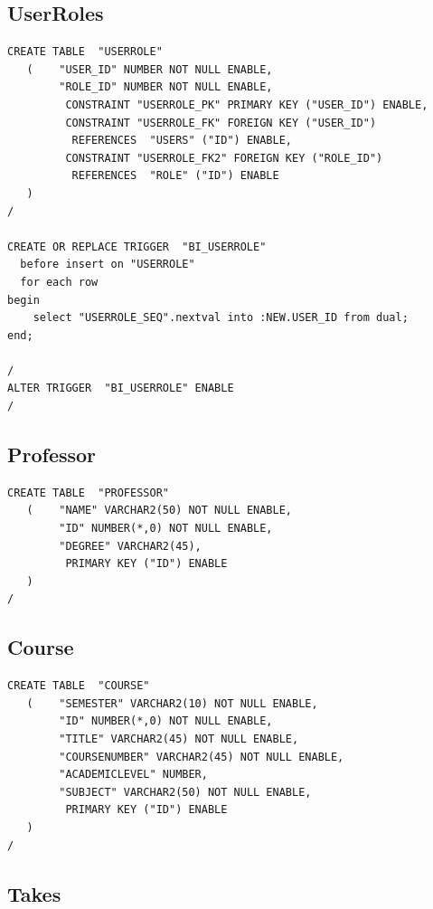 \documentclass[11pt]{article}
\begin{document}
\subsection{UserRoles}
\label{sec-4-3}



\begin{verbatim}
CREATE TABLE  "USERROLE" 
   (    "USER_ID" NUMBER NOT NULL ENABLE, 
        "ROLE_ID" NUMBER NOT NULL ENABLE, 
         CONSTRAINT "USERROLE_PK" PRIMARY KEY ("USER_ID") ENABLE, 
         CONSTRAINT "USERROLE_FK" FOREIGN KEY ("USER_ID")
          REFERENCES  "USERS" ("ID") ENABLE, 
         CONSTRAINT "USERROLE_FK2" FOREIGN KEY ("ROLE_ID")
          REFERENCES  "ROLE" ("ID") ENABLE
   )
/

CREATE OR REPLACE TRIGGER  "BI_USERROLE" 
  before insert on "USERROLE"               
  for each row  
begin   
    select "USERROLE_SEQ".nextval into :NEW.USER_ID from dual; 
end; 

/
ALTER TRIGGER  "BI_USERROLE" ENABLE
/
\end{verbatim}
\subsection{Professor}
\label{sec-4-4}



\begin{verbatim}
CREATE TABLE  "PROFESSOR" 
   (    "NAME" VARCHAR2(50) NOT NULL ENABLE, 
        "ID" NUMBER(*,0) NOT NULL ENABLE, 
        "DEGREE" VARCHAR2(45), 
         PRIMARY KEY ("ID") ENABLE
   )
/
\end{verbatim}
\subsection{Course}
\label{sec-4-5}



\begin{verbatim}
CREATE TABLE  "COURSE" 
   (    "SEMESTER" VARCHAR2(10) NOT NULL ENABLE, 
        "ID" NUMBER(*,0) NOT NULL ENABLE, 
        "TITLE" VARCHAR2(45) NOT NULL ENABLE, 
        "COURSENUMBER" VARCHAR2(45) NOT NULL ENABLE, 
        "ACADEMICLEVEL" NUMBER, 
        "SUBJECT" VARCHAR2(50) NOT NULL ENABLE, 
         PRIMARY KEY ("ID") ENABLE
   )
/
\end{verbatim}
\subsection{Takes}
\label{sec-4-6}
\end{document}
